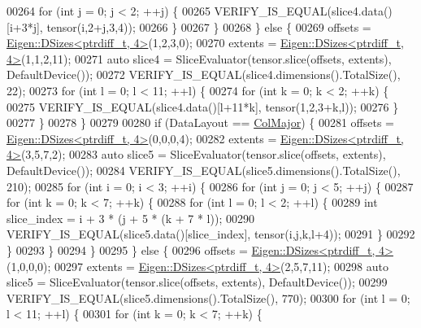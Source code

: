 \begin{DoxyCode}
00264       \textcolor{keywordflow}{for} (\textcolor{keywordtype}{int} j = 0; j < 2; ++j) \{
00265         VERIFY\_IS\_EQUAL(slice4.data()[i+3*j], tensor(i,2+j,3,4));
00266       \}
00267     \}
00268   \} \textcolor{keywordflow}{else} \{
00269     offsets = \hyperlink{struct_eigen_1_1_d_sizes}{Eigen::DSizes<ptrdiff\_t, 4>}(1,2,3,0);
00270     extents = \hyperlink{struct_eigen_1_1_d_sizes}{Eigen::DSizes<ptrdiff\_t, 4>}(1,1,2,11);
00271     \textcolor{keyword}{auto} slice4 = SliceEvaluator(tensor.slice(offsets, extents), DefaultDevice());
00272     VERIFY\_IS\_EQUAL(slice4.dimensions().TotalSize(), 22);
00273     \textcolor{keywordflow}{for} (\textcolor{keywordtype}{int} l = 0; l < 11; ++l) \{
00274       \textcolor{keywordflow}{for} (\textcolor{keywordtype}{int} k = 0; k < 2; ++k) \{
00275         VERIFY\_IS\_EQUAL(slice4.data()[l+11*k], tensor(1,2,3+k,l));
00276       \}
00277     \}
00278   \}
00279 
00280   \textcolor{keywordflow}{if} (DataLayout == \hyperlink{group__enums_ggaacded1a18ae58b0f554751f6cdf9eb13a0cbd4bdd0abcfc0224c5fcb5e4f6669a}{ColMajor}) \{
00281     offsets = \hyperlink{struct_eigen_1_1_d_sizes}{Eigen::DSizes<ptrdiff\_t, 4>}(0,0,0,4);
00282     extents = \hyperlink{struct_eigen_1_1_d_sizes}{Eigen::DSizes<ptrdiff\_t, 4>}(3,5,7,2);
00283     \textcolor{keyword}{auto} slice5 = SliceEvaluator(tensor.slice(offsets, extents), DefaultDevice());
00284     VERIFY\_IS\_EQUAL(slice5.dimensions().TotalSize(), 210);
00285     \textcolor{keywordflow}{for} (\textcolor{keywordtype}{int} i = 0; i < 3; ++i) \{
00286       \textcolor{keywordflow}{for} (\textcolor{keywordtype}{int} j = 0; j < 5; ++j) \{
00287         \textcolor{keywordflow}{for} (\textcolor{keywordtype}{int} k = 0; k < 7; ++k) \{
00288           \textcolor{keywordflow}{for} (\textcolor{keywordtype}{int} l = 0; l < 2; ++l) \{
00289             \textcolor{keywordtype}{int} slice\_index = i + 3 * (j + 5 * (k + 7 * l));
00290             VERIFY\_IS\_EQUAL(slice5.data()[slice\_index], tensor(i,j,k,l+4));
00291           \}
00292         \}
00293       \}
00294     \}
00295   \} \textcolor{keywordflow}{else} \{
00296     offsets = \hyperlink{struct_eigen_1_1_d_sizes}{Eigen::DSizes<ptrdiff\_t, 4>}(1,0,0,0);
00297     extents = \hyperlink{struct_eigen_1_1_d_sizes}{Eigen::DSizes<ptrdiff\_t, 4>}(2,5,7,11);
00298     \textcolor{keyword}{auto} slice5 = SliceEvaluator(tensor.slice(offsets, extents), DefaultDevice());
00299     VERIFY\_IS\_EQUAL(slice5.dimensions().TotalSize(), 770);
00300     \textcolor{keywordflow}{for} (\textcolor{keywordtype}{int} l = 0; l < 11; ++l) \{
00301       \textcolor{keywordflow}{for} (\textcolor{keywordtype}{int} k = 0; k < 7; ++k) \{

\end{DoxyCode}
